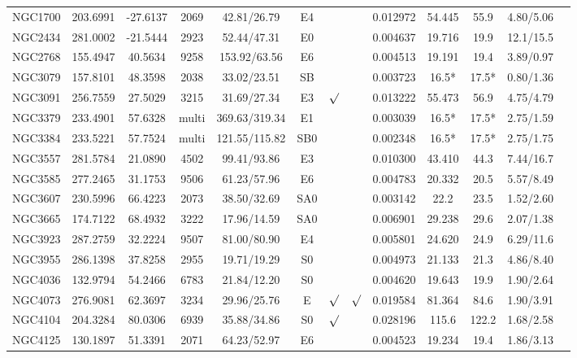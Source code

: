\documentclass[iop]{emulateapj}
\begin{document}
\begin{table}
\begin{tabular}{lcccccccccccc}
NGC1700 & 203.6991 & -27.6137 & 2069  & 42.81/26.79  & E4  &       &  & 0.012972 & 54.445 & 55.9  & 4.80/5.06  \\
NGC2434 & 281.0002 & -21.5444 & 2923  & 52.44/47.31  & E0  &       &  & 0.004637 & 19.716 & 19.9  & 12.1/15.5  \\
NGC2768 & 155.4947 & 40.5634 & 9258   & 153.92/63.56  & E6  &       &  & 0.004513 & 19.191 & 19.4 & 3.89/0.97 \\
NGC3079 & 157.8101 & 48.3598 & 2038  & 33.02/23.51  & SB  &        & & 0.003723 & 16.5* & 17.5* & 0.80/1.36 \\
NGC3091 & 256.7559 & 27.5029 & 3215 & 31.69/27.34 & E3 & $\surd$ & & 0.013222 & 55.473 & 56.9 & 4.75/4.79  \\
NGC3379 & 233.4901 & 57.6328 & multi  & 369.63/319.34 & E1 &        & & 0.003039 & 16.5* & 17.5* & 2.75/1.59 \\
NGC3384 & 233.5221 & 57.7524 & multi & 121.55/115.82 & SB0 &       & & 0.002348 & 16.5* & 17.5* & 2.75/1.75 \\
NGC3557 & 281.5784 & 21.0890  & 4502  & 99.41/93.86  & E3  &   &      & 0.010300 & 43.410 & 44.3 & 7.44/16.7  \\
NGC3585 & 277.2465 & 31.1753 & 9506  & 61.23/57.96  & E6  &     &    & 0.004783 & 20.332 & 20.5  &  5.57/8.49  \\
NGC3607 & 230.5996 & 66.4223  & 2073  & 38.50/32.69  & SA0 &     &    & 0.003142 & 22.2 & 23.5 & 1.52/2.60  \\
NGC3665 & 174.7122 & 68.4932  & 3222  & 17.96/14.59  & SA0 &      &   & 0.006901 & 29.238 & 29.6 & 2.07/1.38  \\
NGC3923 & 287.2759 & 32.2224  & 9507  & 81.00/80.90  & E4  &       &  & 0.005801 & 24.620 & 24.9 & 6.29/11.6  \\
NGC3955 & 286.1398 & 37.8258  & 2955  & 19.71/19.29  & S0  &        & & 0.004973 & 21.133 & 21.3 & 4.86/8.40  \\
NGC4036 & 132.9794 & 54.2466 &  6783  & 21.84/12.20  & S0 &        &  & 0.004620 & 19.643 & 19.9 & 1.90/2.64 \\
NGC4073 & 276.9081 & 62.3697 & 3234 & 29.96/25.76 & E  & $\surd$ & $\surd$ & 0.019584 & 81.364 & 84.6 & 1.90/3.91  \\
NGC4104 & 204.3284 & 80.0306 &  6939 & 35.88/34.86    & S0  & $\surd$ && 0.028196 & 115.6  & 122.2 &  1.68/2.58  \\
NGC4125 & 130.1897 & 51.3391  & 2071   & 64.23/52.97 & E6  &   &      & 0.004523 & 19.234 & 19.4 & 1.86/3.13  \\

\end{tabular}
\end{table}
\end{document}
